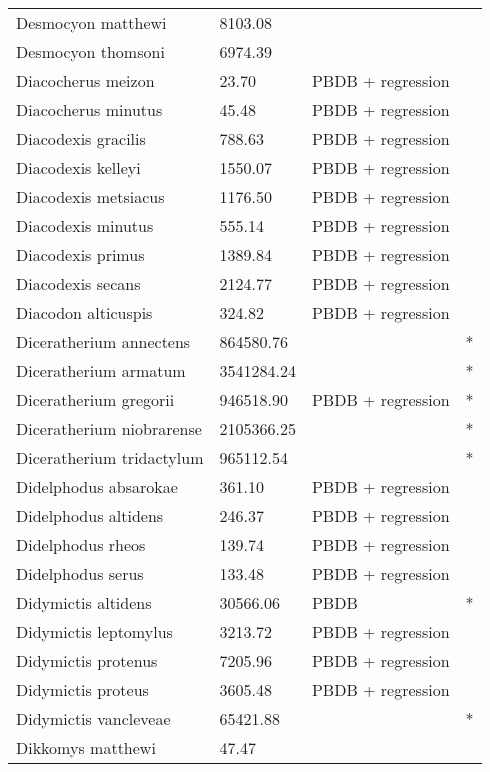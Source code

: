 \documentclass{article}
\begin{document}
\begin{center}
\begin{longtable}{p{} p{} p{} p{}}
    Desmocyon matthewi & 8103.08 & \cite{Tomiya2013} &  \\ 
    Desmocyon thomsoni & 6974.39 & \cite{Tomiya2013} &  \\ 
    Diacocherus meizon & 23.70 & PBDB + regression &  \\ 
    Diacocherus minutus & 45.48 & PBDB + regression &  \\ 
    Diacodexis gracilis & 788.63 & PBDB + regression &  \\ 
    Diacodexis kelleyi & 1550.07 & PBDB + regression &  \\ 
    Diacodexis metsiacus & 1176.50 & PBDB + regression &  \\ 
    Diacodexis minutus & 555.14 & PBDB + regression &  \\ 
    Diacodexis primus & 1389.84 & PBDB + regression &  \\ 
    Diacodexis secans & 2124.77 & PBDB + regression &  \\ 
    Diacodon alticuspis & 324.82 & PBDB + regression &  \\ 
    Diceratherium annectens & 864580.76 & \cite{Tomiya2013} & * \\ 
    Diceratherium armatum & 3541284.24 & \cite{Tomiya2013} & * \\ 
    Diceratherium gregorii & 946518.90 & PBDB + regression & * \\ 
    Diceratherium niobrarense & 2105366.25 & \cite{Tomiya2013} & * \\ 
    Diceratherium tridactylum & 965112.54 & \cite{Tomiya2013} & * \\ 
    Didelphodus absarokae & 361.10 & PBDB + regression &  \\ 
    Didelphodus altidens & 246.37 & PBDB + regression &  \\ 
    Didelphodus rheos & 139.74 & PBDB + regression &  \\ 
    Didelphodus serus & 133.48 & PBDB + regression &  \\ 
    Didymictis altidens & 30566.06 & PBDB & * \\ 
    Didymictis leptomylus & 3213.72 & PBDB + regression &  \\ 
    Didymictis protenus & 7205.96 & PBDB + regression &  \\ 
    Didymictis proteus & 3605.48 & PBDB + regression &  \\ 
    Didymictis vancleveae & 65421.88 & \cite{Scott2004} & * \\ 
    Dikkomys matthewi & 47.47 & \cite{Tomiya2013} &  \\ 

\end{longtable}
\end{center}
\end{document}

